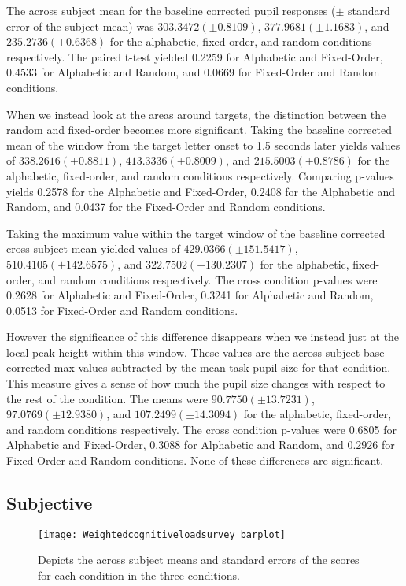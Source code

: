 \documentclass[10pt]{article}
\begin{document}
The across subject mean for the baseline corrected pupil responses
($\pm$ standard error of the subject mean) was $ 303.3472 (\pm 0.8109)$,
$377.9681 (\pm 1.1683)$, and $235.2736 (\pm 0.6368)$ for the alphabetic,
fixed-order, and random conditions respectively.
The paired t-test
yielded 0.2259 for Alphabetic and Fixed-Order, 0.4533 for Alphabetic
and Random, and 0.0669 for Fixed-Order and Random conditions.

When we instead look at the areas around targets, the distinction
between the random and fixed-order becomes more significant.  Taking
the baseline corrected mean of the window from the target letter
onset to 1.5 seconds later yields values of $338.2616 (\pm 0.8811)$,
$413.3336 (\pm 0.8009)$, and $215.5003 (\pm 0.8786)$ for the alphabetic,
fixed-order, and random conditions respectively.  Comparing p-values
yields 0.2578 for the Alphabetic and Fixed-Order, 0.2408 for the
Alphabetic and Random, and 0.0437 for the Fixed-Order and Random conditions.

Taking the maximum value within the target window of the baseline
corrected cross subject mean yielded  values of $429.0366 (\pm
151.5417)$, $510.4105 (\pm 142.6575)$, and $322.7502 (\pm 130.2307)$ for
the alphabetic, fixed-order, and random conditions respectively.
The cross condition p-values were 0.2628 for Alphabetic and
Fixed-Order, 0.3241 for Alphabetic and Random, 0.0513 for
Fixed-Order and Random conditions.

However the significance of this difference disappears when we
instead just at the local peak height within this window.  These
values are the across subject base corrected max values subtracted
by the mean task pupil size for that condition.  This measure gives
a sense of how much the pupil size changes with respect to the rest
of the condition. The means were $90.7750 (\pm 13.7231)$, $97.0769 (\pm
12.9380)$, and $107.2499 (\pm 14.3094)$ for the alphabetic,
fixed-order, and random conditions respectively.  The cross
condition p-values were 0.6805 for Alphabetic and Fixed-Order,
0.3088 for Alphabetic and Random, and 0.2926 for Fixed-Order and
Random conditions.  None of these differences are significant.


\subsection{Subjective}

\begin{figure}[t]
  \centering
  \texttt{[image: Weightedcognitiveloadsurvey\_barplot]}
  \caption{Depicts the across subject means and standard errors of
  the scores for each condition in the three conditions.  }
  \label{cogLoad}
\end{figure}
\end{document}
